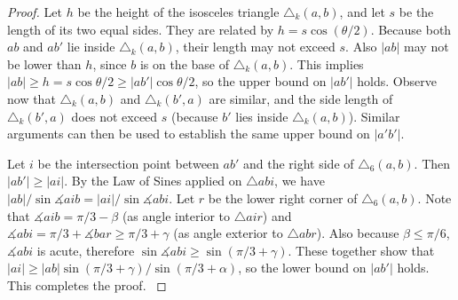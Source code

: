 \documentclass[runningheads,a4paper]{llncs}
\newcommand{\ABox}{
\raisebox{3pt}{\framebox[6pt]{\rule{6pt}{0pt}}}
}
\newcommand{\ang}{\measuredangle}
\begin{document}
\abbalemma*
\begin{proof}
Let $h$ be the height of the isosceles triangle $\triangle_k(a, b)$, and let $s$ be the length of its two equal sides. They are related by $h = s\cos(\theta/2)$. Because both $ab$ and $ab'$ lie inside $\triangle_k(a, b)$, their length may not exceed $s$. Also $|ab|$ may not be lower than $h$, since $b$ is on the base of $\triangle_k(a, b)$. This implies 
$|ab| \ge h = s\cos\theta/2 \ge |ab'|\cos\theta/2$, so the upper bound on $|ab'|$ holds.  
Observe now that $\triangle_k(a, b)$ and $\triangle_k(b', a)$ are similar, and the side length of $\triangle_k(b', a)$  does not exceed $s$ (because $b'$ lies inside $\triangle_k(a,b)$). Similar arguments can then be used to establish the same upper bound on $|a'b'|$. 

Let $i$ be the intersection point between $ab'$ and the right side of 
$\triangle_6(a, b)$. Then $|ab'| \ge |ai|$. By the Law of Sines applied on $\triangle abi$, we have 
$|ab|/\sin\ang{aib} = |ai|/\sin\ang{abi}$. Let $r$ be the lower right corner of $\triangle_6(a, b)$. Note that $\ang{aib} = \pi/3-\beta$ (as angle interior to $\triangle air$) and $\ang{abi} = \pi/3+\ang{bar} \ge \pi/3+\gamma$ (as angle exterior to $\triangle abr$). Also because $\beta \le \pi/6$, $\ang{abi}$ is acute, therefore $\sin\ang{abi} \ge \sin(\pi/3+\gamma)$. These together show that $|ai| \ge |ab|\sin(\pi/3+\gamma)/\sin(\pi/3+\alpha)$, so the lower bound on $|ab'|$ holds. This completes the proof. 
{\hfill\ABox}\end{proof}
\end{document}
